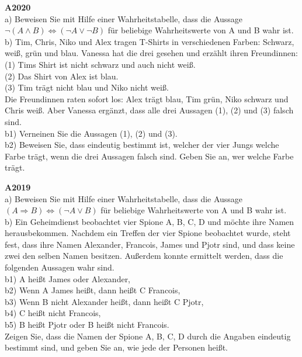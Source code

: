 \documentclass[landscape,twocolumn,a4paper]{article}
\begin{document}
\parindent 0mm



\textbf{A2020} \\

a) Beweisen Sie mit Hilfe einer Wahrheitstabelle, dass die Aussage $ \lnot(A \land B) \Leftrightarrow (\lnot A \lor \lnot B)$ für beliebige Wahrheitswerte von A und B wahr ist. \\


b) Tim, Chris, Niko und Alex tragen T-Shirts in verschiedenen Farben: Schwarz, weiß, grün und
blau. Vanessa hat die drei gesehen und erzählt ihren Freundinnen: \\
(1) Tims Shirt ist nicht schwarz und auch nicht weiß. \\
(2) Das Shirt von Alex ist blau. \\
(3) Tim trägt nicht blau und Niko nicht weiß. \\
Die Freundinnen raten sofort los: Alex trägt blau, Tim grün, Niko schwarz und Chris weiß.
Aber Vanessa ergänzt, dass alle drei Aussagen (1), (2) und (3) falsch sind. \\

b1) Verneinen Sie die Aussagen (1), (2) und (3). \\
b2) Beweisen Sie, dass eindeutig bestimmt ist, welcher der vier Jungs welche Farbe trägt,
wenn die drei Aussagen falsch sind. Geben Sie an, wer welche Farbe trägt.
\bigskip 

\textbf{A2019} \\

a) Beweisen Sie mit Hilfe einer Wahrheitstabelle, 
dass die Aussage $(A \Rightarrow B) \Leftrightarrow (\lnot A \lor B) $
für beliebige Wahrheitswerte von A und B wahr ist. \\

b) Ein Geheimdienst beobachtet vier Spione A, B, C, D und möchte ihre Namen herausbekommen.
Nachdem ein Treffen der vier Spione beobachtet wurde, steht fest, dass ihre Namen
Alexander, Francois, James und Pjotr sind, und dass keine zwei den selben Namen besitzen.
Außerdem konnte ermittelt werden, dass die folgenden Aussagen wahr sind. \\

b1) A heißt James oder Alexander, \\
b2) Wenn A James heißt, dann heißt C Francois, \\
b3) Wenn B nicht Alexander heißt, dann heißt C Pjotr, \\
b4) C heißt nicht Francois, \\
b5) B heißt Pjotr oder B heißt nicht Francois. \\
Zeigen Sie, dass die Namen der Spione A, B, C, D durch
die Angaben eindeutig bestimmt
sind, und geben Sie an, wie jede der Personen heißt.
\bigskip 
\end{document}
